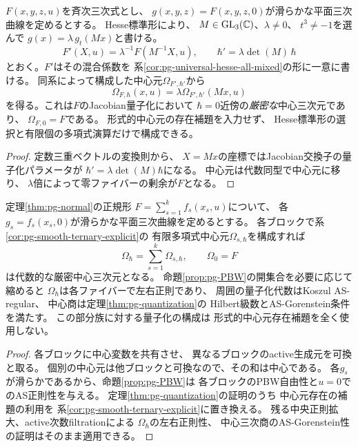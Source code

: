 \begin{corollary}[任意の滑らかな平面三次制限]\label{cor:pg-smooth-ternary-explicit}
$F(x,y,z,u)$を斉次三次式とし、
$g(x,y,z)=F(x,y,z,0)$が滑らかな平面三次曲線を定めるとする。
Hesse標準形\cite[Lemma~1]{ArtebaniDolgachev}により、
$M\in\mathrm{GL}_3(\mathbb C)$、$\lambda\ne0$、
$t^3\ne-1$を選んで
$g(x)=\lambda\,g_t(Mx)$と書ける。
\begin{equation}
 F'(X,u)=\lambda^{-1}F(M^{-1}X,u),
 \qquad \hbar'=\lambda\det(M)\,\hbar
\end{equation}
とおく。$F'$はその混合係数を
系\ref{cor:pg-universal-hesse-all-mixed}の形に一意に書ける。
同系によって構成した中心元$\Omega_{F',\hbar'}$から
\begin{equation}
 \boxed{\quad
 \Omega_{F,\hbar}(x,u)
 =\lambda\Omega_{F',\hbar'}(Mx,u)
 \quad}
 \label{eq:pg-hm-arbitrary-ternary}
\end{equation}
を得る。これは$F$のJacobian量子化において
$\hbar=0$近傍の\emph{厳密な}中心三次元であり、
$\Omega_{F,0}=F$である。
形式的中心元の存在補題を入力せず、
Hesse標準形の選択と有限個の多項式演算だけで構成できる。
\end{corollary}
\begin{proof}
定数三重ベクトルの変換則から、
$X=Mx$の座標ではJacobian交換子の量子化パラメータが
$\hbar'=\lambda\det(M)\hbar$になる。
中心元は代数同型で中心元に移り、
$\lambda$倍によって零ファイバーの剰余が$F$となる。
\end{proof}

\begin{corollary}[滑らかな制限を持つ全Poissonブロックの明示的代数的量子化]
\label{cor:pg-smooth-block-algebraic-quant}
定理\ref{thm:pg-normal}の正規形
$F=\sum_{s=1}^k f_s(x_s,u)$について、
各$g_s=f_s(x_s,0)$が滑らかな平面三次曲線を定めるとする。
各ブロックで系\ref{cor:pg-smooth-ternary-explicit}の
有限多項式中心元$\Omega_{s,\hbar}$を構成すれば
\begin{equation}
 \Omega_\hbar=\sum_{s=1}^k\Omega_{s,\hbar},
 \qquad \Omega_0=F
\end{equation}
は代数的な厳密中心三次元となる。
命題\ref{prop:pg-PBW}の開集合を必要に応じて縮めると
$\Omega_\hbar$は各ファイバーで左右正則であり、
周囲の量子化代数はKoszul AS-regular、
中心商は定理\ref{thm:pg-quantization}の
Hilbert級数とAS-Gorenstein条件を満たす。
この部分族に対する量子化の構成は
形式的中心元存在補題を全く使用しない。
\end{corollary}
\begin{proof}
各ブロックに中心変数を共有させ、
異なるブロックのactive生成元を可換と取る。
個別の中心元は他ブロックと可換なので、その和は中心である。
各$g_s$が滑らかであるから、命題\ref{prop:pg-PBW}は
各ブロックのPBW自由性と$u=0$でのAS正則性を与える。
定理\ref{thm:pg-quantization}の証明のうち
中心元存在の補題の利用を
系\ref{cor:pg-smooth-ternary-explicit}に置き換える。
残る中央正則拡大、active次数filtrationによる
$\Omega_\hbar$の左右正則性、
中心三次商のAS-Gorenstein性の証明はそのまま適用できる。
\end{proof}

